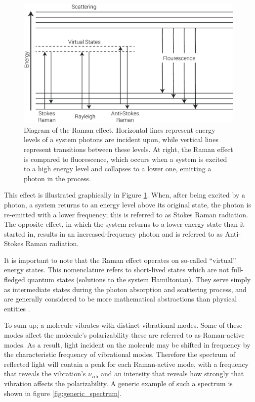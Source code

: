 \begin{figure}[h]
\centering
\includegraphics[width=0.7\linewidth]{raman_effect}
\caption{Diagram of the Raman effect. Horizontal lines represent energy levels of a system photons are incident upon, while vertical lines represent transitions between these levels. At right, the Raman effect is compared to fluorescence, which occurs when a system is excited to a high energy level and collapses to a lower one, emitting a photon in the process.}
\label{fig:raman_effect}
\end{figure}

This effect is illustrated graphically in Figure \ref{fig:raman_effect}. When, after being excited by a photon, a system returns to an energy level above its original state, the photon is re-emitted with a lower frequency; this is referred to as Stokes Raman radiation. The opposite effect, in which the system returns to a lower energy state than it started in, results in an increased-frequency photon and is referred to as Anti-Stokes Raman radiation.

It is important to note that the Raman effect operates on so-called ``virtual'' energy states. This nomenclature refers to short-lived states which are not full-fledged quantum states (solutions to the system Hamiltonian). They serve simply as intermediate states during the photon absorption and scattering process, and are generally considered to be more mathematical abstractions than physical entities \cite{RefWorks:31}.

To sum up; a molecule vibrates with distinct vibrational modes. Some of these modes affect the molecule's polarizability \textemdash these are referred to as Raman-active modes. As a result, light incident on the molecule may be shifted in frequency by the characteristic frequency of vibrational modes. Therefore the spectrum of reflected light will contain a peak for each Raman-active mode, with a frequency that reveals the vibration's $\nu_\mathrm{vib}$ and an intensity that reveals how strongly that vibration affects the polarizability. A generic example of such a spectrum is shown in figure \ref{fig:generic_spectrum}.


